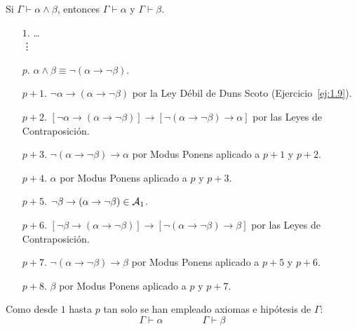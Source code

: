 \begin{ejercicio}\label{ej:1.23}
    Si $\Gamma \vdash \alpha \land \beta$, entonces $\Gamma \vdash \alpha$ y $\Gamma \vdash \beta$.
    \begin{enumerate}
        \item[$1$.] \ldots\\\vdots
        \item[$p$.] $\alpha\land\beta\equiv \neg(\alpha\rightarrow\neg\beta)$.
        \item[$p+1$.] $\neg \alpha\rightarrow(\alpha\rightarrow\neg\beta)$ por la Ley Débil de Duns Scoto (Ejercicio~\ref{ej:1.9}).
        \item[$p+2$.] $[\neg \alpha\rightarrow(\alpha\rightarrow\neg\beta)]\rightarrow[\neg(\alpha\rightarrow\neg\beta)\rightarrow \alpha]$ por las Leyes de Contraposición.
        \item[$p+3$.] $\neg(\alpha\rightarrow\neg\beta)\rightarrow \alpha$ por Modus Ponens aplicado a $p+1$ y $p+2$.
        \item[$p+4$.] $\alpha$ por Modus Ponens aplicado a $p$ y $p+3$.
        \item[$p+5$.] $\neg \beta\rightarrow(\alpha\rightarrow\neg\beta)\in \mathcal{A}_1$.
        \item[$p+6$.] $[\neg \beta\rightarrow(\alpha\rightarrow\neg\beta)]\rightarrow[\neg(\alpha\rightarrow\neg\beta)\rightarrow \beta]$ por las Leyes de Contraposición.
        \item[$p+7$.] $\neg(\alpha\rightarrow\neg\beta)\rightarrow \beta$ por Modus Ponens aplicado a $p+5$ y $p+6$.
        \item[$p+8$.] $\beta$ por Modus Ponens aplicado a $p$ y $p+7$.
    \end{enumerate}

    Como desde $1$ hasta $p$ tan solo se han empleado axiomas e hipótesis de $\Gamma$:
    \begin{equation*}
        \Gamma \vdash \alpha\qquad\qquad \Gamma \vdash \beta
    \end{equation*}
\end{ejercicio}

